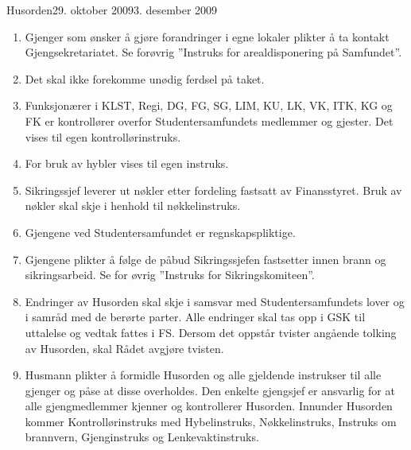\begin{instruks}{Husorden}{29. oktober 2009}{3. desember 2009}
\begin{enumerate}
            egne regler/instrukser.
            Disse skal godkjennes av Finansstyret.
        \item Gjenger som ønsker å gjøre forandringer i egne lokaler plikter å ta kontakt
            Gjengsekretariatet. Se forøvrig
            ”Instruks for arealdisponering på Samfundet”.
        \item Det skal ikke forekomme unødig ferdsel på taket.
        \item Funksjonærer i KLST, Regi, DG, FG, SG, LIM, KU, LK, VK, ITK, KG og FK er
            kontrollører overfor
            Studentersamfundets medlemmer og gjester. Det vises til egen
            kontrollørinstruks.
        \item For bruk av hybler vises til egen instruks.
        \item Sikringssjef leverer ut nøkler etter fordeling fastsatt av Finansstyret. Bruk
            av nøkler skal skje i henhold til
            nøkkelinstruks.
        \item Gjengene ved Studentersamfundet er regnskapspliktige.
        \item Gjengene plikter å følge de påbud Sikringssjefen fastsetter innen brann og
            sikringsarbeid. Se for øvrig
            ”Instruks for Sikringskomiteen”.
        \item Endringer av Husorden skal skje i samsvar med Studentersamfundets lover og i
            samråd med de berørte
            parter. Alle endringer skal tas opp i GSK til uttalelse og vedtak fattes i FS.
            Dersom det oppstår tvister
            angående tolking av Husorden, skal Rådet avgjøre tvisten.
        \item Husmann plikter å formidle Husorden og alle gjeldende instrukser til alle
            gjenger og påse at disse
            overholdes. Den enkelte gjengsjef er ansvarlig for at alle gjengmedlemmer
            kjenner og kontrollerer
            Husorden. Innunder Husorden kommer Kontrollørinstruks med Hybelinstruks,
            Nøkkelinstruks, Instruks
            om brannvern, Gjenginstruks og Lenkevaktinstruks.
    \end{enumerate}
\end{instruks}


